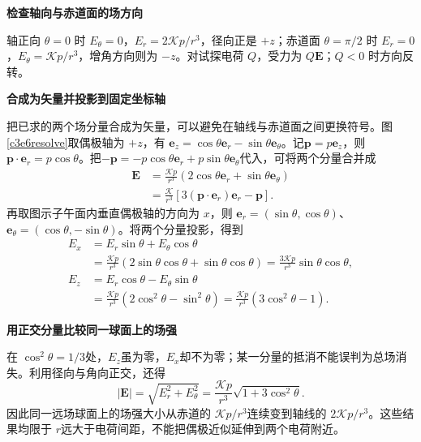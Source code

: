\begin{solution}
\par\medskip{}\noindent\textbf{检查轴向与赤道面的场方向}\par\nobreak
轴正向 $\theta=0$ 时 $E_\theta=0$，$E_r=2\mathcal Kp/r^3$，径向正是 $+z$；赤道面 $\theta=\pi/2$ 时 $E_r=0$，$E_\theta=\mathcal Kp/r^3$，增角方向则为 $-z$。对试探电荷 $Q$，受力为 $Q\bm E$；$Q<0$ 时方向反转。

\par\medskip{}\noindent\textbf{合成为矢量并投影到固定坐标轴}\par\nobreak
把已求的两个场分量合成为矢量，可以避免在轴线与赤道面之间更换符号。图\ref{c3e6resolve}取偶极轴为 $+z$，有
$\bm e_z=\cos\theta\bm e_r-\sin\theta\bm e_\theta$。记$\bm p=p\bm e_z$，则$\bm p\cdot\bm e_r=p\cos\theta$。把$-\bm p=-p\cos\theta\bm e_r+p\sin\theta\bm e_\theta$代入，可将两个分量合并成
\begin{align*}
\bm E&=\frac{\mathcal Kp}{r^3}
 (2\cos\theta\bm e_r+\sin\theta\bm e_\theta)\\
&=\frac{\mathcal K}{r^3}
 [3(\bm p\cdot\bm e_r)\bm e_r-\bm p].
\end{align*}
再取图示子午面内垂直偶极轴的方向为 $x$，则
$\bm e_r=(\sin\theta,\cos\theta)$、
$\bm e_\theta=(\cos\theta,-\sin\theta)$。将两个分量投影，得到
\begin{align*}
E_x&=E_r\sin\theta+E_\theta\cos\theta
\\&=\frac{\mathcal Kp}{r^3}(2\sin\theta\cos\theta+\sin\theta\cos\theta)
=\frac{3\mathcal Kp}{r^3}\sin\theta\cos\theta,\\
E_z&=E_r\cos\theta-E_\theta\sin\theta
\\&=\frac{\mathcal Kp}{r^3}(2\cos^2\theta-\sin^2\theta)
=\frac{\mathcal Kp}{r^3}(3\cos^2\theta-1).
\end{align*}
\par\medskip{}\noindent\textbf{用正交分量比较同一球面上的场强}\par\nobreak
在 $\cos^2\theta=1/3$处，$E_z$虽为零，$E_x$却不为零；某一分量的抵消不能误判为总场消失。利用径向与角向正交，还得
\[|\bm E|=\sqrt{E_r^2+E_\theta^2}
 =\frac{\mathcal Kp}{r^3}\sqrt{1+3\cos^2\theta}.\]
因此同一远场球面上的场强大小从赤道的 $\mathcal Kp/r^3$连续变到轴线的 $2\mathcal Kp/r^3$。这些结果均限于 $r$远大于电荷间距，不能把偶极近似延伸到两个电荷附近。
\end{solution}

